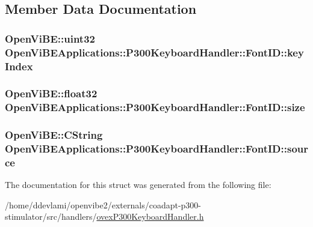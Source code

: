 \subsection{Member Data Documentation}
\hypertarget{structOpenViBEApplications_1_1P300KeyboardHandler_1_1FontID_afc7bea46e01749afed3b58f73a9eef72}{
\subsubsection[{keyIndex}]{\setlength{\rightskip}{0pt plus 5cm}OpenViBE::uint32 {\bf OpenViBEApplications::P300KeyboardHandler::FontID::keyIndex}}}
\label{structOpenViBEApplications_1_1P300KeyboardHandler_1_1FontID_afc7bea46e01749afed3b58f73a9eef72}
\hypertarget{structOpenViBEApplications_1_1P300KeyboardHandler_1_1FontID_aa4db670dc99b46c0dcb33a9ee14052cc}{
\subsubsection[{size}]{\setlength{\rightskip}{0pt plus 5cm}OpenViBE::float32 {\bf OpenViBEApplications::P300KeyboardHandler::FontID::size}}}
\label{structOpenViBEApplications_1_1P300KeyboardHandler_1_1FontID_aa4db670dc99b46c0dcb33a9ee14052cc}
\hypertarget{structOpenViBEApplications_1_1P300KeyboardHandler_1_1FontID_a2ccf859aff3d731b45026efc1a589205}{
\subsubsection[{source}]{\setlength{\rightskip}{0pt plus 5cm}OpenViBE::CString {\bf OpenViBEApplications::P300KeyboardHandler::FontID::source}}}
\label{structOpenViBEApplications_1_1P300KeyboardHandler_1_1FontID_a2ccf859aff3d731b45026efc1a589205}


The documentation for this struct was generated from the following file:\begin{DoxyCompactItemize}
\item 
/home/ddevlami/openvibe2/externals/coadapt-\/p300-\/stimulator/src/handlers/\hyperlink{ovexP300KeyboardHandler_8h}{ovexP300KeyboardHandler.h}\end{DoxyCompactItemize}
